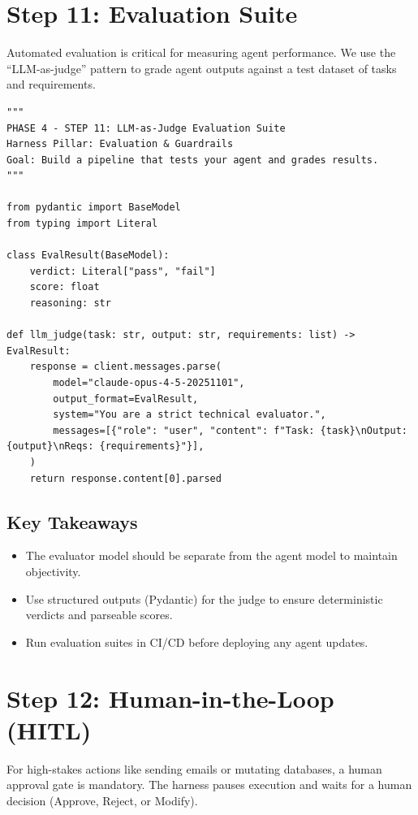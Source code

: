 \section{Step 11: Evaluation Suite}
Automated evaluation is critical for measuring agent performance. We use the ``LLM-as-judge'' pattern to grade agent outputs against a test dataset of tasks and requirements.

\begin{lstlisting}[caption={step11\_evaluation\_suite.py}, label={lst:step11}]
"""
PHASE 4 - STEP 11: LLM-as-Judge Evaluation Suite
Harness Pillar: Evaluation & Guardrails
Goal: Build a pipeline that tests your agent and grades results.
"""

from pydantic import BaseModel
from typing import Literal

class EvalResult(BaseModel):
    verdict: Literal["pass", "fail"]
    score: float
    reasoning: str

def llm_judge(task: str, output: str, requirements: list) -> EvalResult:
    response = client.messages.parse(
        model="claude-opus-4-5-20251101",
        output_format=EvalResult,
        system="You are a strict technical evaluator.",
        messages=[{"role": "user", "content": f"Task: {task}\nOutput: {output}\nReqs: {requirements}"}],
    )
    return response.content[0].parsed
\end{lstlisting}

\subsection*{Key Takeaways}
\begin{itemize}
    \item The evaluator model should be separate from the agent model to maintain objectivity.
    \item Use structured outputs (Pydantic) for the judge to ensure deterministic verdicts and parseable scores.
    \item Run evaluation suites in CI/CD before deploying any agent updates.
\end{itemize}

\section{Step 12: Human-in-the-Loop (HITL)}
For high-stakes actions like sending emails or mutating databases, a human approval gate is mandatory. The harness pauses execution and waits for a human decision (Approve, Reject, or Modify).

